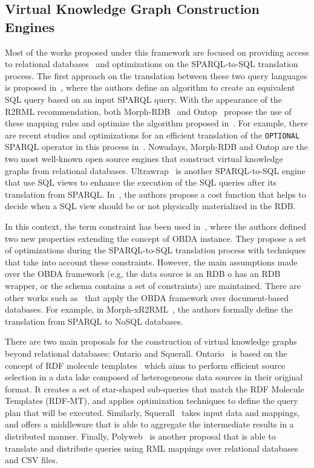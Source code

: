 \subsection{Virtual Knowledge Graph Construction Engines}
Most of the works proposed under this framework are focused on providing access to relational databases~\citep{priyatna2014formalisation,calvanese2017ontop,sequeda2013ultrawrap} and optimizations on the  SPARQL-to-SQL translation process. The first approach on the translation between these two query languages is proposed in~\citep{chebotko2009semantics}, where the authors define an algorithm to create an equivalent SQL query based on an input SPARQL query. With the appearance of the R2RML recommendation, both Morph-RDB~\citep{priyatna2014formalisation} and Ontop~\citep{calvanese2017ontop} propose the use of these mapping rules and optimize the algorithm proposed in~\citep{chebotko2009semantics}. For example, there are recent studies and optimizations for an efficient translation of the \texttt{OPTIONAL} SPARQL operator in this process in~\citep{xiao2018efficient}. Nowadays, Morph-RDB and Ontop are the two most well-known open source engines that construct virtual knowledge graphs from relational databases. Ultrawrap~\citep{sequeda2013ultrawrap,sequeda2014obda} is another SPARQL-to-SQL engine that use SQL views to enhance the execution of the SQL queries after its translation from SPARQL. In~\citep{sequeda2014obda}, the authors propose a cost function that helps to decide when a SQL view should be or not physically materialized in the RDB.

In this context, the term constraint has been used in~\citep{hovland2016obda}, where the authors defined two new properties extending the concept of OBDA instance. They propose a set of optimizations during the SPARQL-to-SQL translation process with techniques that take into account these constraints. However, the main assumptions made over the OBDA framework (e.g, the data source is an RDB o has an RDB wrapper, or the schema contains a set of constraints) are maintained. There are other works such as~\citep{michel2016generic,botoeva2019ontology} that apply the OBDA framework over document-based databases. For example, in Morph-xR2RML~\citep{michel2016mapping}, the authors formally define the translation from SPARQL to NoSQL databases.

There are two main proposals for the construction of virtual knowledge graphs beyond relational databases: Ontario and Squerall. Ontario~\citep{endris2019ontario} is based on the concept of RDF molecule templates~\citep{endris2017mulder} which aims to perform efficient source selection in a data lake composed of heterogeneous data sources in their original format. It creates a set of star-shaped sub-queries that match the RDF Molecule Templates (RDF-MT), and applies optimization techniques to define the query plan that will be executed. Similarly, Squerall~\citep{mami2019querying} takes input data and mappings, and offers a middleware that is able to aggregate the intermediate results in a distributed manner. Finally, Polyweb~\citep{khan2019one} is another proposal that is able to translate and distribute queries using RML mappings over relational databases and CSV files.


